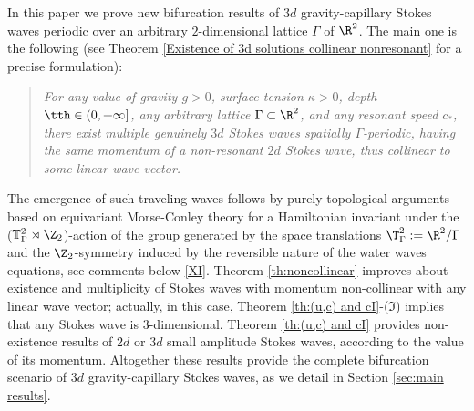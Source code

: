 \documentclass[11pt,a4paper,reqno]{article}
\numberwithin{equation}{section}
\theoremstyle{definition}
\begin{document}
In  this  paper we prove new bifurcation results of $3d$ gravity-capillary  Stokes waves periodic over 
an arbitrary   $2$-dimensional lattice $ \Gamma $ of $ \R^2 $. 
The main one is the following (see Theorem \ref{Existence of 3d solutions collinear nonresonant} for a precise formulation): 
\begin{quote}
\emph{For any value of 
gravity $ g >0 $, surface tension $ \kappa > 0 $, depth 
$ \tth \in (0,+\infty] $, any 
arbitrary lattice 
$ \Gamma \subset \R^2 $, 
and any resonant speed $ c_* $, 
there exist multiple genuinely
$3d$ Stokes waves  spatially  $ \Gamma $-periodic,  having the \emph{same} momentum 
 of a non-resonant $ 2 d $ Stokes wave,
thus  \emph{collinear} to some linear  wave vector.}   
\end{quote}
The emergence  
of such traveling waves  
follows by 
purely topological arguments based on  equivariant Morse-Conley theory for a Hamiltonian  invariant under the ($ \mathbb{T}^2_{\Gamma}
\rtimes \Z_2 $)-action of the  group generated by the  space translations
$\T^2_\Gamma:=\R^2/\Gamma $   and  the $ \Z_2 $-symmetry 
induced 
by the 
reversible nature of the water waves equations,  
see comments   below \eqref{XI}. 
Theorem  \ref{th:noncollinear}
improves 
\cite{CN} about existence and multiplicity  of 
Stokes waves with momentum non-collinear with any linear wave vector; actually, 
in this case,  Theorem 
\ref{th:(u,c) and cI}-($\mathfrak{I}$)
implies that 
any Stokes wave is $ 3$-dimensional.
Theorem \ref{th:(u,c) and cI} provides non-existence results of 
$ 2 d $ or $ 3d $ 
small amplitude Stokes waves,  according to the value of its momentum.
Altogether these results provide the  complete 
bifurcation scenario 
   of    $3d$  gravity-capillary  Stokes waves, as we 
  detail  in Section \ref{sec:main results}.

\smallskip 
\end{document}
